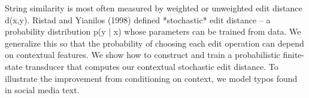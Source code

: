 String similarity is most often measured by weighted or unweighted edit distance d(x,y). Ristad and Yianilos (1998) defined *stochastic* edit distance -- a probability distribution p(y | x) whose parameters can be trained from data. We generalize this so that the probability of choosing each edit operation can depend on contextual features.  We show how to construct and train a probabilistic finite-state transducer that computes our contextual stochastic edit distance. To illustrate the improvement from conditioning on context, we model typos found in social media text.
